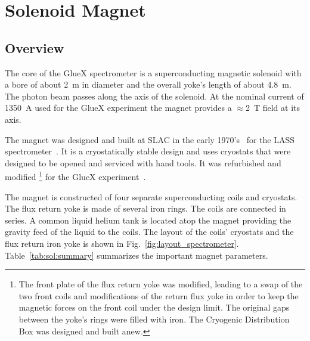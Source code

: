 
\section[Solenoid Magnet]{Solenoid Magnet 
  \label{sec:solenoid}
}

\subsection[Overview]{Overview \label{sec:sol:overview}
}

The core of the GlueX spectrometer is a superconducting magnetic
solenoid with a bore of about 2~m in diameter and the overall
yoke's length of about 4.8~m. The photon beam passes along the axis of
the solenoid.  At the nominal current of 1350~A used for the GlueX
experiment the magnet provides a $\approx$2~T field at its axis.

The magnet was designed and built at SLAC in the early
1970's~\cite{Alcorn-confer-1972} for the LASS
spectrometer~\cite{Aston:1987uc}. It is a cryostatically
stable design and uses cryostats that were designed to be opened and
serviced with hand tools. It was refurbished and modified%
\footnote{
  The front plate of the flux return yoke was modified, leading to a
  swap of the two front coils and modifications of the return flux
  yoke in order to keep the magnetic forces on the front coil under
  the design limit.  The original gaps between the yoke's rings were
  filled with iron. The Cryogenic Distribution Box was designed and
  built anew.
} 
for the GlueX experiment~\cite{Ballard:2011tm, Ballard:2015wma}. 

The magnet is constructed of four separate superconducting coils and
cryostats. The flux return yoke is made of several iron rings.  The
coils are connected in series. A common liquid helium tank is located
atop the magnet providing the gravity feed of the liquid to the
coils. The layout of the coils' cryostats and the flux return iron
yoke is shown in Fig.~\ref{fig:layout_spectrometer}.
Table~\ref{tab:sol:summary} summarizes the important magnet
parameters.

  

